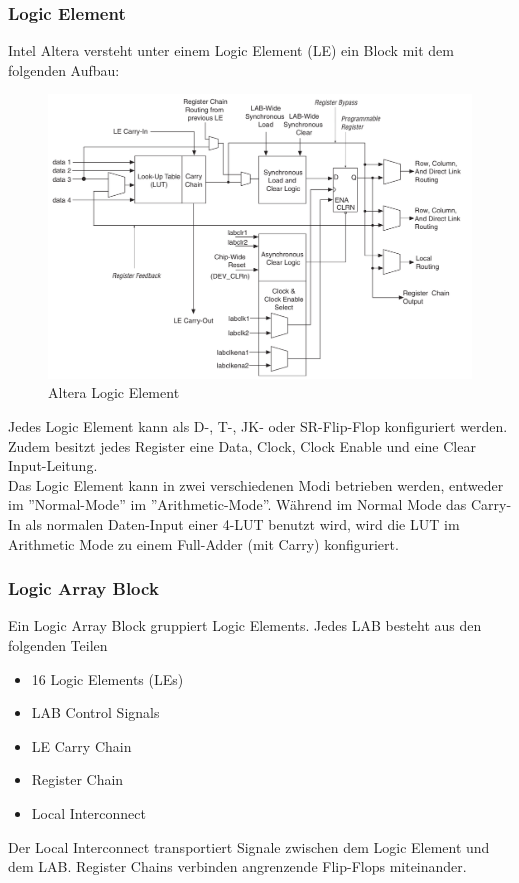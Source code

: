 \subsubsection{Logic Element}
Intel Altera versteht unter einem Logic Element (LE) ein Block mit dem folgenden Aufbau:
\begin{figure}[h!]
\centering
\includegraphics[width=13cm]{pic/logicelement.png}
\caption{Altera Logic Element}
\end{figure}

Jedes Logic Element kann als D-, T-, JK- oder SR-Flip-Flop konfiguriert werden. Zudem besitzt jedes Register eine Data, Clock, Clock Enable und eine Clear Input-Leitung. \\
Das Logic Element kann in zwei verschiedenen Modi betrieben werden, entweder im ''Normal-Mode'' im ''Arithmetic-Mode''. Während im Normal Mode das Carry-In als normalen Daten-Input einer 4-LUT benutzt wird, wird die LUT im Arithmetic Mode zu einem Full-Adder (mit Carry) konfiguriert. 
\subsubsection{Logic Array Block}
Ein Logic Array Block gruppiert Logic Elements. Jedes LAB besteht aus den folgenden Teilen
\begin{itemize}
\item 16 Logic Elements (LEs)
\item LAB Control Signals
\item LE Carry Chain
\item Register Chain
\item Local Interconnect
\end{itemize}
Der Local Interconnect transportiert Signale zwischen dem Logic Element und dem LAB. Register Chains verbinden angrenzende Flip-Flops miteinander. 
